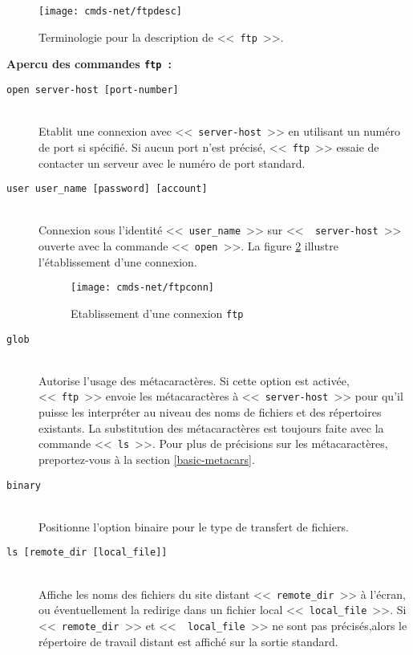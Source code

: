 \begin{figure}[hbtp]
\centering
\texttt{[image: cmds-net/ftpdesc]}
\caption{\label{fig-cmdnet-ftpdesc}Terminologie pour la description de
		<<~{\tt ftp}~>>.}
\end{figure}

{\bf Apercu des commandes {\tt ftp}~:}\\
\begin{description}
	\item[{\tt open server-host [port-number]}]\mbox{}\\
	Etablit une connexion avec <<~{\tt server-host}~>> en utilisant un num{\'e}ro de port
	si sp{\'e}cifi{\'e}. Si aucun port n'est pr{\'e}cis{\'e}, <<~{\tt ftp}~>> essaie de
	contacter un serveur avec le num{\'e}ro de port standard.

	\item[{\tt user user\_name [password] [account]}]\mbox{}\\
	Connexion sous l'identit{\'e} <<~{\tt user\_name}~>> sur <<~{\tt
	server-host}~>> ouverte avec la commande <<~{\tt open}~>>. La figure
	\ref{fig-cmdnet-ftpconn} illustre l'{\'e}tablissement d'une connexion.
	\begin{figure}[hbtp]
	\centering
	\texttt{[image: cmds-net/ftpconn]}
	\caption{\label{fig-cmdnet-ftpconn}Etablissement d'une connexion {\tt ftp}}
	\end{figure}

	\item[{\tt glob}]\mbox{}\\
	Autorise l'usage des m{\'e}tacaract{\`e}res. Si cette option est activ{\'e}e,
	<<~{\tt ftp}~>> envoie les m{\'e}tacaract{\`e}res {\`a} <<~{\tt server-host}~>> pour qu'il
	puisse les interpr{\'e}ter au niveau des noms de fichiers et des
	r{\'e}pertoires existants. La substitution des m{\'e}tacaract{\`e}res est
	toujours faite avec la commande <<~{\tt ls}~>>. Pour plus de pr{\'e}cisions
	sur les m{\'e}tacaract{\`e}res, preportez-vous {\`a} la section \ref{basic-metacars}.

	\item[{\tt binary}]\mbox{}\\
	Positionne l'option binaire pour le type de transfert de fichiers.

	\item[{\tt ls [remote\_dir [local\_file]]}]\mbox{}\\
	Affiche les noms des fichiers du site distant <<~{\tt remote\_dir}~>>
	{\`a} l'{\'e}cran, ou {\'e}ventuellement la redirige dans un fichier local
	<<~{\tt local\_file}~>>. Si <<~{\tt remote\_dir}~>> et <<~{\tt
	local\_file}~>> ne sont pas pr{\'e}cis{\'e}s,alors le r{\'e}pertoire de travail
	distant est affich{\'e} sur la sortie standard.



\end{description}
